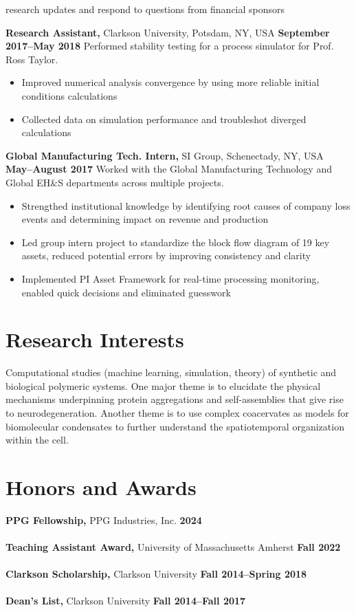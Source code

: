 \documentclass[margin,line]{res}
\begin{document}
\begin{resume}
\begin{itemize}
		      research updates and respond to questions from financial sponsors
	\end{itemize}
	{\bf Research Assistant,} Clarkson University, Potsdam, NY, USA
	\hfill {\bf September 2017--May 2018}
	Performed stability testing for a process simulator for Prof. Ross Taylor.
	\begin{itemize}
		\item Improved numerical analysis convergence by using more reliable
		      initial conditions calculations
		\item Collected data on simulation performance and troubleshot diverged
		      calculations
	\end{itemize}
	{\bf Global Manufacturing Tech. Intern,} SI Group, Schenectady, NY, USA
	\hfill {\bf  May--August 2017}
	Worked with the Global Manufacturing Technology and Global EH\&S departments
	across multiple projects.
	\begin{itemize}
		\item Strengthed institutional knowledge by identifying root causes of
		      company loss events and determining impact on revenue and production
		\item Led group intern project to standardize the block flow diagram of
		      19 key assets, reduced potential errors by improving consistency and
		      clarity
		\item Implemented PI Asset Framework for real-time processing monitoring,
		      enabled quick decisions and eliminated guesswork
	\end{itemize}
	\vspace{-1em}

	\section{\sc Research Interests}
	Computational studies (machine learning, simulation, theory) of synthetic and
	biological polymeric systems. One major theme is to elucidate the physical
	mechanisms underpinning protein aggregations and self-assemblies that give
	rise to neurodegeneration. Another theme is to use complex coacervates as
	models for biomolecular condensates to further understand the spatiotemporal
	organization within the cell.

	\section{\sc Honors and Awards}
	 {\bf PPG Fellowship,} PPG Industries, Inc. \hfill {\bf 2024}\\
	\\
	{\bf Teaching Assistant Award,} University of Massachusetts Amherst \hfill {\bf Fall 2022}\\
	\\
	{\bf Clarkson Scholarship,} Clarkson University \hfill {\bf Fall 2014--Spring 2018}\\
	\\
	{\bf Dean's List,} Clarkson University \hfill {\bf Fall 2014--Fall 2017}\\


\end{resume}
\end{document}
